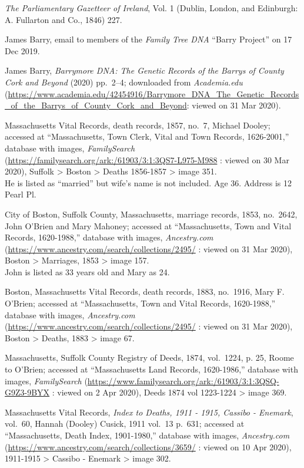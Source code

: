 \begin{thebibliography}{999}
\textit{The Parliamentary Gazetteer of Ireland}, Vol. 1 (Dublin, London, and Edinburgh: A. Fullarton and Co., 1846) 227.

James Barry, email to members of the \textit{Family Tree DNA} ``Barry Project'' on 17 Dec 2019.

James Barry, \textit{Barrymore DNA: The Genetic Records of the Barrys of County Cork and Beyond} (2020) pp.\ 2--4; downloaded from \textit{Academia.edu} (\url{https://www.academia.edu/42454916/Barrymore_DNA_The_Genetic_Records_of_the_Barrys_of_County_Cork_and_Beyond}: viewed on 31 Mar 2020).



Massachusetts Vital Records, death records, 1857, no.\ 7, Michael Dooley; accessed at ``Massachusetts, Town Clerk, Vital and Town Records, 1626-2001,'' database with images, \textit{FamilySearch} (\url{https://familysearch.org/ark:/61903/3:1:3QS7-L975-M988} : viewed on 30 Mar 2020), Suffolk > Boston > Deaths 1856-1857 > image 351.\\
He is listed as ``married'' but wife's name is not included. Age 36. Address is 12 Pearl Pl.

City of Boston, Suffolk County, Massachusetts, marriage records, 1853, no.\ 2642, John O'Brien and Mary Mahoney; accessed at ``Massachusetts, Town and Vital Records, 1620-1988,'' database with images, \textit{Ancestry.com} (\url{https://www.ancestry.com/search/collections/2495/} : viewed on 31 Mar 2020), Boston > Marriages, 1853 > image 157.\\
John is listed as 33 years old and Mary as 24.

Boston, Massachusetts Vital Records, death records, 1883, no.\ 1916, Mary F. O'Brien; accessed at ``Massachusetts, Town and Vital Records, 1620-1988,'' database with images, \textit{Ancestry.com} (\url{https://www.ancestry.com/search/collections/2495/} : viewed on 31 Mar 2020), Boston > Deaths, 1883 > image 67.

Massachusetts, Suffolk County Registry of Deeds, 1874, vol.\ 1224, p. 25, Roome to O'Brien; accessed at ``Massachusetts Land Records, 1620-1986,'' database with images, \textit{FamilySearch} (\url{https://www.familysearch.org/ark:/61903/3:1:3QSQ-G9Z3-9BYX} : viewed on 2 Apr 2020), Deeds 1874 vol 1223-1224 > image 369.

Massachusetts Vital Records, \textit{Index to Deaths, 1911 - 1915, Cassibo - Enemark}, vol.\ 60, Hannah (Dooley) Cusick, 1911 vol.\ 13 p.\ 631; accessed at ``Massachusetts, Death Index, 1901-1980,'' database with images, \textit{Ancestry.com} (\url{https://www.ancestry.com/search/collections/3659/} : viewed on 10 Apr 2020), 1911-1915 > Cassibo - Enemark > image 302.


\end{thebibliography}
